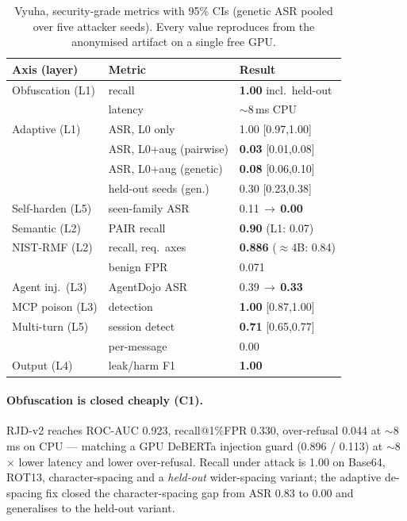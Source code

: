 \documentclass[11pt]{article}
\begin{document}
\begin{table}[t]
\centering\footnotesize\setlength{\tabcolsep}{4pt}
\begin{tabular}{@{}lll@{}}
\toprule
\textbf{Axis (layer)} & \textbf{Metric} & \textbf{Result} \\
\midrule
Obfuscation (L1) & recall & \textbf{1.00} incl.\ held-out \\
 & latency & $\sim$8\,ms CPU \\
Adaptive (L1) & ASR, L0 only & 1.00 [0.97,1.00] \\
 & ASR, L0+aug (pairwise) & \textbf{0.03} [0.01,0.08] \\
 & ASR, L0+aug (genetic) & \textbf{0.08} [0.06,0.10] \\
 & held-out seeds (gen.) & 0.30 [0.23,0.38] \\
Self-harden (L5) & seen-family ASR & 0.11\,$\rightarrow$\,\textbf{0.00} \\
Semantic (L2) & PAIR recall & \textbf{0.90} (L1: 0.07) \\
NIST-RMF (L2) & recall, req.\ axes & \textbf{0.886} ($\approx$4B: 0.84) \\
 & benign FPR & 0.071 \\
Agent inj.\ (L3) & AgentDojo ASR & 0.39\,$\rightarrow$\,\textbf{0.33} \\
MCP poison (L3) & detection & \textbf{1.00} [0.87,1.00] \\
Multi-turn (L5) & session detect & \textbf{0.71} [0.65,0.77] \\
 & per-message & 0.00 \\
Output (L4) & leak/harm F1 & \textbf{1.00} \\
\bottomrule
\end{tabular}
\caption{Vyuha, security-grade metrics with 95\% CIs (genetic ASR pooled over five attacker seeds).
Every value reproduces from the anonymised artifact on a single free GPU.}
\label{tab:main}
\end{table}

\paragraph{Obfuscation is closed cheaply (C1).} RJD-v2 reaches ROC-AUC 0.923, recall@1\%FPR 0.330,
over-refusal 0.044 at $\sim$8\,ms on CPU --- matching a GPU DeBERTa injection guard (0.896 / 0.113)
at $\sim$8$\times$ lower latency and lower over-refusal. Recall under attack is 1.00 on Base64, ROT13,
character-spacing and a \emph{held-out} wider-spacing variant; the adaptive de-spacing fix closed the
character-spacing gap from ASR 0.83 to 0.00 and generalises to the held-out variant.
\end{document}
